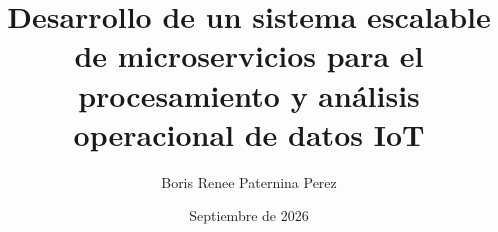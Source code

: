 \newcommand{\Escuela}{ESCUELA POLITÉCNICA}

\newcommand{\Titulacion}{MÁSTER UNIVERSITARIO EN ANÁLISIS DE GRANDES VOLÚMENES DE DATOS (BIG DATA)}

\newcommand{\Tipo}{TRABAJO FIN DE MÁSTER} 

\newcommand{\Titulo}{Desarrollo de un sistema escalable de microservicios para el procesamiento y análisis operacional de datos IoT} 

\newcommand{\TituloCaps}{DESARROLLO DE UN SISTEMA ESCALABLE DE MICROSERVICIOS PARA EL PROCESAMIENTO Y ANÁLISIS OPERACIONAL DE DATOS IOT} 

\newcommand{\NombreAutor}{Boris Renee Paternina Perez}

\newcommand{\NombreAutorCaps}{BORIS RENEE PATERNINA PEREZ}

\newcommand{\NombreTutor}{VICTOR GOMEZ GUIRADO} 

\newcommand{\Fecha}{Septiembre de 2026}

\newcommand{\Curso}{CURSO 2025 - 2026}

\title{\Titulo}
\author{\NombreAutor}
\date{\Fecha}
